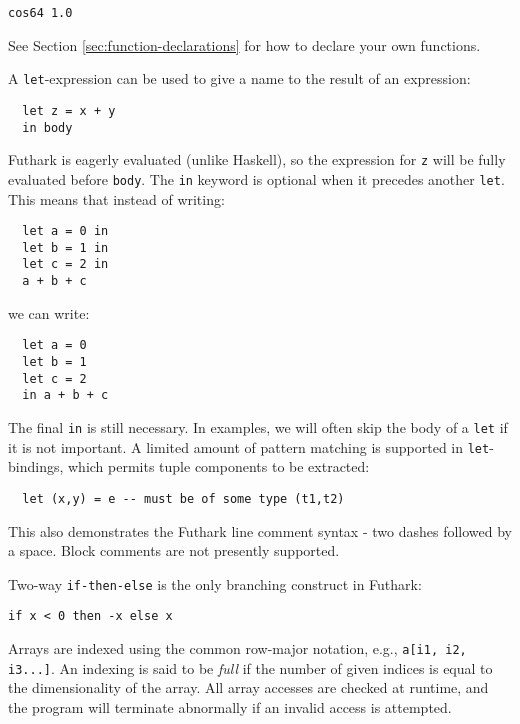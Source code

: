 \documentclass[11pt]{book}
\begin{document}
\begin{lstlisting}
cos64 1.0
\end{lstlisting}

See Section \ref{sec:function-declarations} for how to declare your
own functions.

A \texttt{let}-expression can be used to give a name to the result of
an expression:

\begin{lstlisting}
  let z = x + y
  in body
\end{lstlisting}

Futhark is eagerly evaluated (unlike Haskell), so the expression for
\texttt{z} will be fully evaluated before \texttt{body}.  The \texttt{in} keyword is optional when it precedes another
\texttt{let}.  This means that instead of writing:

\begin{lstlisting}
  let a = 0 in
  let b = 1 in
  let c = 2 in
  a + b + c
\end{lstlisting}

we can write:

\begin{lstlisting}
  let a = 0
  let b = 1
  let c = 2
  in a + b + c
\end{lstlisting}

The final \texttt{in} is still necessary.  In examples, we will often
skip the body of a \texttt{let} if it is not important.  A limited
amount of pattern matching is supported in \texttt{let}-bindings,
which permits tuple components to be extracted:

\begin{lstlisting}
  let (x,y) = e -- must be of some type (t1,t2)
\end{lstlisting}

This also demonstrates the Futhark line comment syntax - two dashes
followed by a space.  Block comments are not presently supported.

Two-way \texttt{if-then-else} is the only branching construct in
Futhark:

\begin{lstlisting}
if x < 0 then -x else x
\end{lstlisting}

Arrays are indexed using the common row-major notation, e.g.,
\texttt{a[i1, i2, i3...]}.  An indexing is said to be \textit{full} if
the number of given indices is equal to the dimensionality of the
array.  All array accesses are checked at runtime, and the program
will terminate abnormally if an invalid access is attempted.
\end{document}
